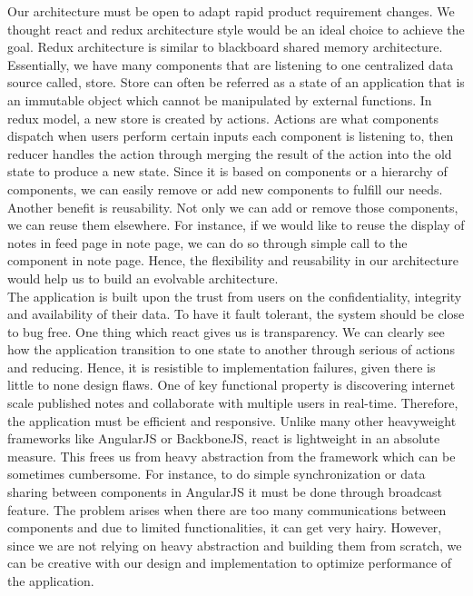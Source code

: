 \documentclass[12pt]{article}
\begin{document}
  Our architecture must be open to adapt rapid product requirement changes. We thought react and redux architecture style would be an ideal choice to achieve the goal. Redux architecture is similar to blackboard shared memory architecture. Essentially, we have many components that are listening to one centralized data source called, store. Store can often be referred as a state of an application that is an immutable object which cannot be manipulated by external functions. In redux model, a new store is created by actions. Actions are what components dispatch when users perform certain inputs each component is listening to, then reducer handles the action through merging the result of the action into the old state to produce a new state. Since it is based on components or a hierarchy of components, we can easily remove or add new components to fulfill our needs. Another benefit is reusability. Not only we can add or remove those components, we can reuse them elsewhere. For instance, if we would like to reuse the display of notes in feed page in note page, we can do so through simple call to the component in note page. Hence, the flexibility and reusability in our architecture would help us to build an evolvable architecture. \\

  The application is built upon the trust from users on the confidentiality, integrity and availability of their data. To have it fault tolerant, the system should be close to bug free. One thing which react gives us is transparency. We can clearly see how the application transition to one state to another through serious of actions and reducing. Hence, it is resistible to implementation failures, given there is little to none design flaws. One of key functional property is discovering internet scale published notes and collaborate with multiple users in real-time. Therefore, the application must be efficient and responsive. Unlike many other heavyweight frameworks like AngularJS or BackboneJS, react is lightweight in an absolute measure. This frees us from heavy abstraction from the framework which can be sometimes cumbersome. For instance, to do simple synchronization or data sharing between components in AngularJS it must be done through broadcast feature. The problem arises when there are too many communications between components and due to limited functionalities, it can get very hairy. However, since we are not relying on heavy abstraction and building them from scratch, we can be  creative with our design and implementation to optimize performance of the application. \\
\end{document}
